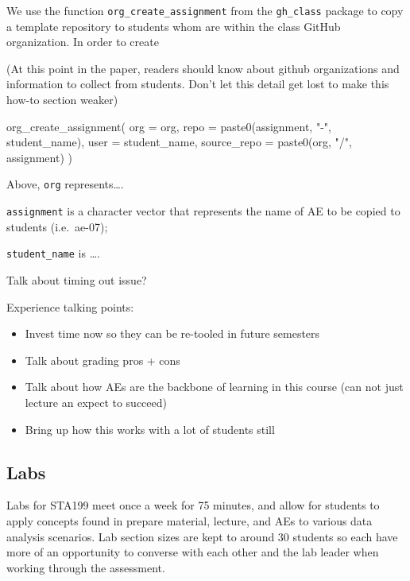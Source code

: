 \documentclass[
  12pt]{article}
\newenvironment{Shaded}{\begin{snugshade}}{\end{snugshade}}
\newcommand{\AttributeTok}[1]{\textcolor[rgb]{0.40,0.45,0.13}{#1}}
\newcommand{\FunctionTok}[1]{\textcolor[rgb]{0.28,0.35,0.67}{#1}}
\newcommand{\NormalTok}[1]{\textcolor[rgb]{0.00,0.23,0.31}{#1}}
\newcommand{\StringTok}[1]{\textcolor[rgb]{0.13,0.47,0.30}{#1}}
\begin{document}
We use the function \texttt{org\_create\_assignment} from the
\texttt{gh\_class} package to copy a template repository to students
whom are within the class GitHub organization. In order to create

(At this point in the paper, readers should know about github
organizations and information to collect from students. Don't let this
detail get lost to make this how-to section weaker)

\begin{Shaded}
\begin{Highlighting}[]
\FunctionTok{org\_create\_assignment}\NormalTok{(}
  \AttributeTok{org =}\NormalTok{ org,}
  \AttributeTok{repo =} \FunctionTok{paste0}\NormalTok{(assignment, }\StringTok{"{-}"}\NormalTok{, student\_name),}
  \AttributeTok{user =}\NormalTok{ student\_name,}
  \AttributeTok{source\_repo =} \FunctionTok{paste0}\NormalTok{(org, }\StringTok{"/"}\NormalTok{, assignment)}
\NormalTok{)}
\end{Highlighting}
\end{Shaded}

Above, \texttt{org} represents\ldots.

\texttt{assignment} is a character vector that represents the name of AE
to be copied to students (i.e.~ae-07);

\texttt{student\_name} is \ldots.

Talk about timing out issue?

Experience talking points:

\begin{itemize}
\item
  Invest time now so they can be re-tooled in future semesters
\item
  Talk about grading pros + cons
\item
  Talk about how AEs are the backbone of learning in this course (can
  not just lecture an expect to succeed)
\item
  Bring up how this works with a lot of students still
\end{itemize}

\hypertarget{labs}{%
\subsection{Labs}\label{labs}}

Labs for STA199 meet once a week for 75 minutes, and allow for students
to apply concepts found in prepare material, lecture, and AEs to various
data analysis scenarios. Lab section sizes are kept to around 30
students so each have more of an opportunity to converse with each other
and the lab leader when working through the assessment.
\end{document}
